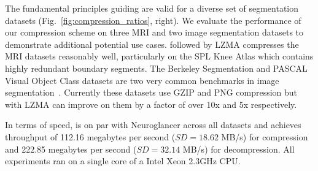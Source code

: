The fundamental principles guiding \appName are valid for a diverse set of segmentation datasets (Fig.~\ref{fig:compression_ratios}, right). We evaluate the performance of our compression scheme on three MRI and two image segmentation datasets to demonstrate additional potential use cases. \appName followed by LZMA compresses the MRI datasets reasonably well, particularly on the SPL Knee Atlas which contains highly redundant boundary segments.
The Berkeley Segmentation and PASCAL Visual Object Class datasets are two very common benchmarks in image segmentation~\cite{MartinFTM01,pascal-voc-2012}. Currently these datasets use GZIP and PNG compression but \appName with LZMA can improve on them by a factor of over 10x and 5x respectively. 

In terms of speed, \appName is on par with Neuroglancer across all datasets and achieves throughput of 112.16 megabytes per second ($SD = 18.62$ MB/s) for compression and 222.85 megabytes per second ($SD = 32.14$ MB/s) for decompression. All experiments ran on a single core of a Intel Xeon 2.3GHz CPU.

